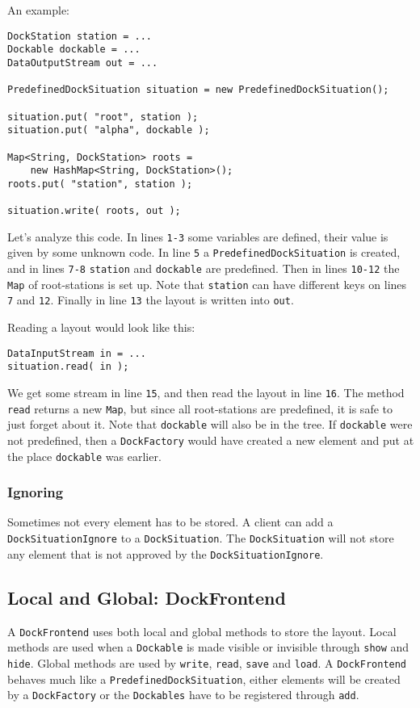 \documentclass[a4paper,10pt]{article}
\newcommand{\src}[1]{\lstinline[basicstyle=\normalsize\ttfamily,keywordstyle=\normalsize\ttfamily,identifierstyle=\normalsize\ttfamily]|#1|}
\begin{document}
An example:
\begin{lstlisting}
DockStation station = ...
Dockable dockable = ...
DataOutputStream out = ...

PredefinedDockSituation situation = new PredefinedDockSituation();

situation.put( "root", station );
situation.put( "alpha", dockable );

Map<String, DockStation> roots = 
	new HashMap<String, DockStation>();
roots.put( "station", station );

situation.write( roots, out );
\end{lstlisting}
Let's analyze this code. In lines \src{1-3} some variables are defined, their value is given by some unknown code. In line \src{5} a \src{PredefinedDockSituation} is created, and in lines \src{7-8} \src{station} and \src{dockable} are predefined. Then in lines \src{10-12} the \src{Map} of root-stations is set up. Note that \src{station} can have different keys on lines \src{7} and \src{12}. Finally in line \src{13} the layout is written into \src{out}.

Reading a layout would look like this:
\begin{lstlisting}[firstnumber=15]
DataInputStream in = ...
situation.read( in );
\end{lstlisting}
We get some stream in line \src{15}, and then read the layout in line \src{16}. The method \src{read} returns a new \src{Map}, but since all root-stations are predefined, it is safe to just forget about it. Note that \src{dockable} will also be in the tree. If \src{dockable} were not predefined, then a \src{DockFactory} would have created a new element and put at the place \src{dockable} was earlier.

\subsubsection{Ignoring}
Sometimes not every element has to be stored. A client can add a \\\src{DockSituationIgnore} to a \src{DockSituation}. The \src{DockSituation} will not store any element that is not approved by the \src{DockSituationIgnore}.

\subsection{Local and Global: DockFrontend}
A \src{DockFrontend} uses both local and global methods to store the layout. Local methods are used when a \src{Dockable} is made visible or invisible through \src{show} and \src{hide}. Global methods are used by \src{write}, \src{read}, \src{save} and \src{load}. A \src{DockFrontend} behaves much like a \src{PredefinedDockSituation}, either elements will be created by a \src{DockFactory} or the \src{Dockables} have to be registered through \src{add}.
\end{document}
